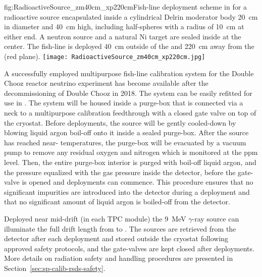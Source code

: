 \begin{dunefigure}{fig:RadioactiveSource_zm40cm_xp220cm}{Fish-line deployment scheme in  for a radioactive source encapsulated inside a cylindrical Delrin moderator body \SI{20}{\cm} in diameter and \SI{40}{\cm} high, including half-spheres with a radius of \SI{10}{\cm} at either end. A  neutron source and a natural Ni target are sealed inside at the center. The fish-line is deployed \SI{40}{\cm} outside of the  and \SI{220}{\cm} away from the  (red plane).}
\texttt{[image: RadioactiveSource\_zm40cm\_xp220cm.jpg]}
\end{dunefigure}


A successfully employed multipurpose fish-line calibration
system for the Double Chooz reactor neutrino experiment has become available 
after the decommissioning of Double Chooz in 2018. The system can be easily refitted for use in . The system will be housed inside a purge-box that is connected via a neck to a multipurpose calibration feedthrough with a closed gate valve on top of the cryostat. Before deployments, the source will be gently cooled-down by blowing liquid argon boil-off onto it inside a sealed purge-box. After the source has reached 
near- temperatures, the purge-box will be evacuated by a vacuum pump to remove any residual oxygen and nitrogen which is monitored at the ppm level. Then, the entire purge-box interior is purged with boil-off liquid argon, and the pressure equalized with the gas pressure inside the detector, before the gate-valve is opened and deployments can commence. This procedure ensures that no significant impurities are introduced into the detector during a deployment and that no significant amount of liquid argon is boiled-off from the detector. 


Deployed near mid-drift (in each TPC module) the \SI{9}{\MeV} $\gamma$-ray source can illuminate the full drift length from  to . The sources are retrieved from the detector after each deployment and stored outside the cryostat following approved safety protocols, and the gate-valves are kept closed after deployments. More details on radiation safety and handling procedures are presented in Section~\ref{sec:sp-calib-rsds-safety}.

